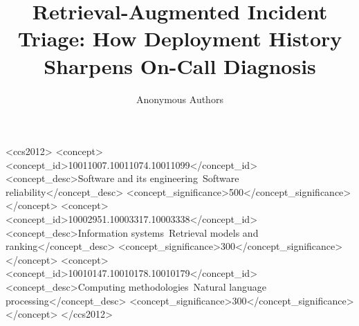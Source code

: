 \documentclass[sigconf, review, anonymous]{acmart}
\begin{document}
\title{Retrieval-Augmented Incident Triage: How Deployment History Sharpens On-Call Diagnosis}

\author{Anonymous Authors}

\begin{abstract}

\end{abstract}

\begin{CCSXML}
<ccs2012>
  <concept>
    <concept_id>10011007.10011074.10011099</concept_id>
    <concept_desc>Software and its engineering~Software reliability</concept_desc>
    <concept_significance>500</concept_significance>
  </concept>
  <concept>
    <concept_id>10002951.10003317.10003338</concept_id>
    <concept_desc>Information systems~Retrieval models and ranking</concept_desc>
    <concept_significance>300</concept_significance>
  </concept>
  <concept>
    <concept_id>10010147.10010178.10010179</concept_id>
    <concept_desc>Computing methodologies~Natural language processing</concept_desc>
    <concept_significance>300</concept_significance>
  </concept>
</ccs2012>
\end{CCSXML}



\maketitle














\end{document}
